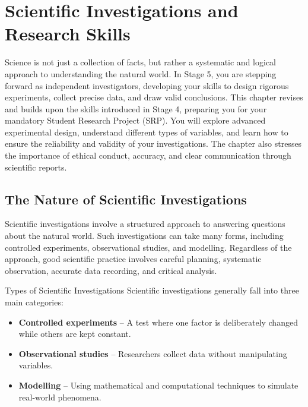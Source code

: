 \chapter{Scientific Investigations and Research Skills}

Science is not just a collection of facts, but rather a systematic and logical approach to understanding the natural world. In Stage 5, you are stepping forward as independent investigators, developing your skills to design rigorous experiments, collect precise data, and draw valid conclusions. This chapter revises and builds upon the skills introduced in Stage 4, preparing you for your mandatory Student Research Project (SRP). You will explore advanced experimental design, understand different types of variables, and learn how to ensure the reliability and validity of your investigations. The chapter also stresses the importance of ethical conduct, accuracy, and clear communication through scientific reports.

\section{The Nature of Scientific Investigations}

Scientific investigations involve a structured approach to answering questions about the natural world. Such investigations can take many forms, including controlled experiments, observational studies, and modelling. Regardless of the approach, good scientific practice involves careful planning, systematic observation, accurate data recording, and critical analysis.

\begin{keyconcept}{Types of Scientific Investigations}
Scientific investigations generally fall into three main categories:
\begin{itemize}
    \item \textbf{Controlled experiments} – A test where one factor is deliberately changed while others are kept constant.
    \item \textbf{Observational studies} – Researchers collect data without manipulating variables.
    \item \textbf{Modelling} – Using mathematical and computational techniques to simulate real-world phenomena.
\end{itemize}
\end{keyconcept}


